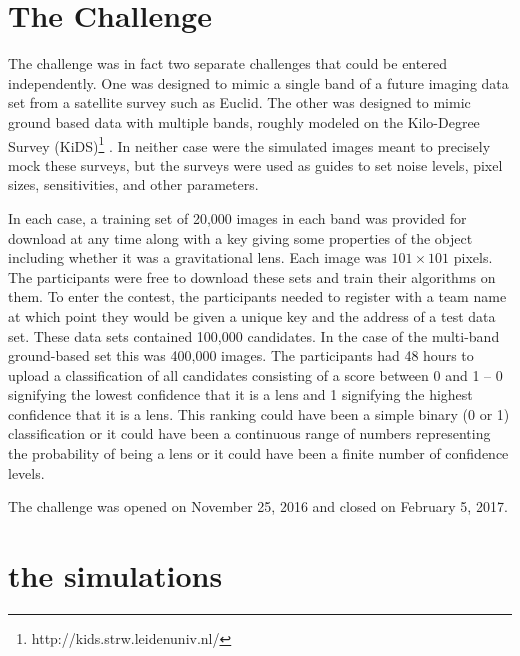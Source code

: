 \documentclass{aa}
\begin{document}
\section{The Challenge}
\label{sec:challenge}

The challenge was in fact two separate challenges that could be entered independently.  One was designed to mimic a single band of a future imaging data set from a satellite survey such as Euclid.  The other was designed to mimic ground based data with multiple bands, roughly modeled on the Kilo-Degree Survey (KiDS)\footnote{http://kids.strw.leidenuniv.nl/} \citep{2013ExA....35...25D}. In neither case were the simulated images meant to precisely mock these surveys, but the surveys were used as guides to set noise levels, pixel sizes, sensitivities, and other parameters.

In each case, a training set of 20,000 images in each band was provided for download at any time along with a key giving some properties of the object including whether it was a gravitational lens.  Each image was $101\times101$ pixels.  The participants were free to download these sets and train their algorithms on them.  To enter the contest, the participants needed to register with a team name at which point they would be given a unique key and the address of a test data set.  These data sets contained 100,000 candidates.  In the case of the multi-band ground-based set this was 400,000 images. The participants had 48 hours to upload a classification of all candidates consisting of a score between 0 and 1 -- 0 signifying the lowest confidence that it is a lens and 1 signifying the highest confidence that it is a lens.  This ranking could have been a simple binary (0 or 1) classification  or it could have been a continuous range of numbers representing the probability of being a lens or it could have been a finite number of confidence levels.  

The challenge was opened on November 25, 2016 and closed on February 5, 2017.

\section{the simulations}
\label{sec:simulation}
\end{document}
